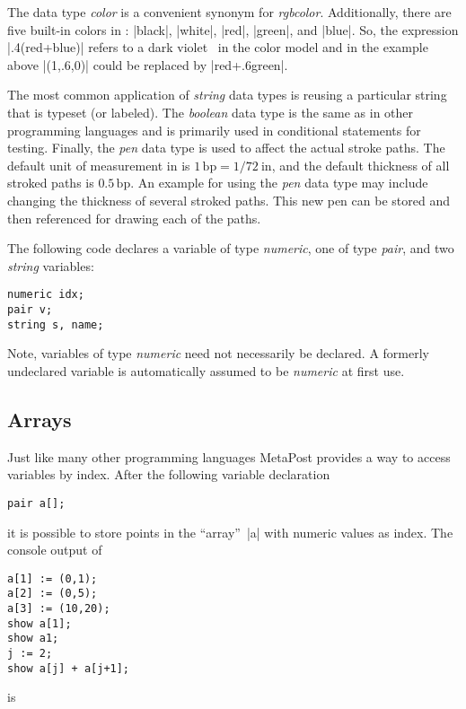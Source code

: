 The data type \textit{color} is a convenient synonym for
\textit{rgbcolor}.  Additionally, there are five built-in \RGB{} colors
in \MP{}: |black|, |white|, |red|, |green|, and |blue|.  So, the
expression |.4(red+blue)| refers to a dark violet~
in the \RGB{} color model and in the example above |(1,.6,0)| could be
replaced by |red+.6green|.

The most common application of \textit{string} data types is reusing a
particular string that is typeset (or labeled).  The \textit{boolean}
data type is the same as in other programming languages and is primarily
used in conditional statements for testing.  Finally, the \textit{pen}
data type is used to affect the actual stroke paths.  The default unit
of measurement in \MP{} is $1\,\mathrm{bp}=1/72\mathrm{\ in}$, and the
default thickness of all stroked paths is $0.5\,\mathrm{bp}$.  An
example for using the \textit{pen} data type may include changing the
thickness of several stroked paths.  This new pen can be stored and then
referenced for drawing each of the paths.

The following code declares a variable of type \textit{numeric}, one of
type \textit{pair}, and two \textit{string} variables:

\begin{lstlisting}[style=MP]
numeric idx;
pair v;
string s, name;
\end{lstlisting}

Note, variables of type \textit{numeric} need not necessarily be
declared.  A formerly undeclared variable is automatically assumed to be
\textit{numeric} at first use.


\subsection{Arrays}
Just like many other programming languages MetaPost provides a way to
access variables by index.  After the following variable declaration

\begin{lstlisting}[style=MP]
pair a[];
\end{lstlisting}
it is possible to store points in the ``array''~|a| with numeric values
as index.  The console output of

\begin{lstlisting}[style=MP]
a[1] := (0,1);
a[2] := (0,5);
a[3] := (10,20);
show a[1];
show a1;
j := 2;
show a[j] + a[j+1];
\end{lstlisting}
is

